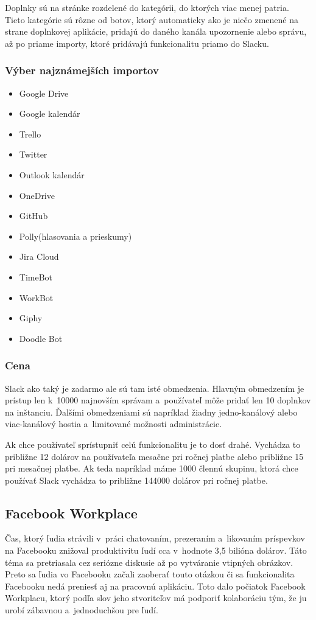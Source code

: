 \indent Doplnky sú na stránke rozdelené do kategórii, do ktorých viac menej patria. Tieto kategórie sú rôzne od botov, ktorý automaticky ako je niečo zmenené na strane doplnkovej aplikácie, pridajú do daného kanála upozornenie alebo správu, až po priame importy, ktoré pridávajú funkcionalitu priamo do Slacku.
\subsubsection{Výber najznámejších importov}
\begin{itemize}
    \item Google Drive
    \item Google kalendár
    \item Trello
    \item Twitter
    \item Outlook kalendár
    \item OneDrive
    \item GitHub
    \item Polly(hlasovania a prieskumy)
    \item Jira Cloud
    \item TimeBot
    \item WorkBot
    \item Giphy
    \item Doodle Bot
\end{itemize}
\subsubsection{Cena}
\indent Slack ako taký je zadarmo ale sú tam isté obmedzenia. Hlavným obmedzením je prístup len k 10000 najnovším správam a používateľ môže pridať len 10 doplnkov na inštanciu. Ďalšími obmedzeniami sú napríklad žiadny jedno-kanálový alebo viac-kanálový hostia a limitované možnosti administrácie. 

\indent Ak chce používateľ sprístupniť celú funkcionalitu je to dosť drahé. Vychádza to približne 12 dolárov na používateľa mesačne pri ročnej platbe alebo približne 15 pri mesačnej platbe. Ak teda napríklad máme 1000 člennú skupinu, ktorá chce používať Slack vychádza to približne 144000 dolárov pri ročnej platbe.

\subsection{Facebook Workplace}
\indent Čas, ktorý ľudia strávili v práci chatovaním, prezeraním a likovaním príspevkov na Facebooku znižoval produktivitu ľudí cca v hodnote 3,5 bilióna dolárov. Táto téma sa pretriasala cez seriózne diskusie až po vytváranie vtipných obrázkov. Preto sa ľudia vo Facebooku začali zaoberať touto otázkou či sa funkcionalita Facebooku nedá preniesť aj na pracovnú aplikáciu. Toto dalo počiatok Facebook Workplacu, ktorý podľa slov jeho stvoriteľov má podporiť kolaboráciu tým, že ju urobí zábavnou a jednoduchšou pre ľudí.

